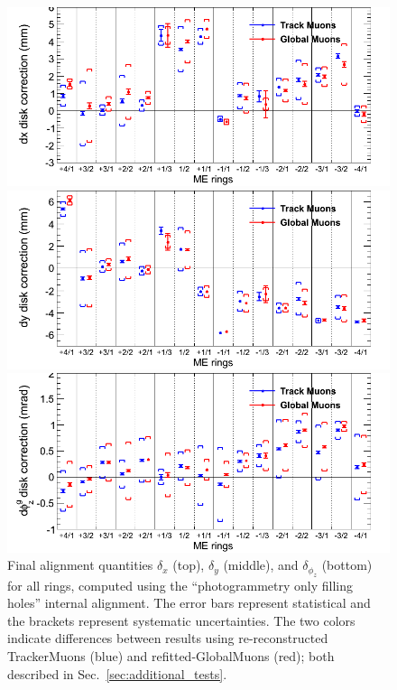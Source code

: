 \documentclass[12pt]{article}
\begin{document}
\begin{figure}
\begin{center}
\includegraphics[width=0.85\linewidth]{finaltkgb1.png}

\includegraphics[width=0.85\linewidth]{finaltkgb2.png}

\includegraphics[width=0.85\linewidth]{finaltkgb3.png}
\end{center}

\caption{Final alignment quantities $\delta_x$ (top), $\delta_y$
  (middle), and $\delta_{\phi_z}$ (bottom) for all rings, computed
  using the ``photogrammetry only filling holes'' internal alignment.
  The error bars represent statistical and the brackets represent
  systematic uncertainties.  The two colors indicate differences
  between results using re-reconstructed TrackerMuons (blue) and
  refitted-GlobalMuons (red); both described in
  Sec.~\ref{sec:additional_tests}. \label{fig:finaltkgb}}
\end{figure}
\end{document}
